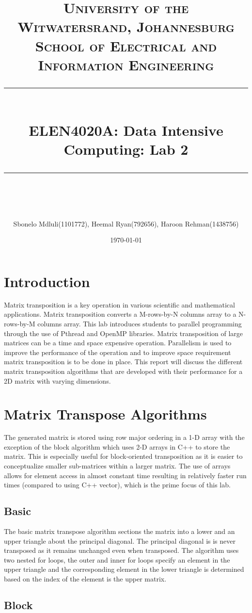 \documentclass[10pt,journal]{article}
\title{	
	\normalfont\largesize
	\textbf{\textsc{University of the Witwatersrand, Johannesburg}}\\
	\textsc{School of Electrical and Information Engineering}\\ 
	\vspace{5pt} %
	\rule{\linewidth}{0.5pt}\\ %
	\vspace{10pt} %
	{\huge ELEN4020A: Data Intensive Computing: Lab 2}\\ %
	\vspace{1pt} %
	\rule{\linewidth}{2pt}\\ %
	\vspace{1pt} %
}
\author{ Sbonelo Mdluli(1101772), Heemal Ryan(792656), Haroon Rehman(1438756) }
\date{\large\today}
\begin{document}
\maketitle 

\section{Introduction}
Matrix transposition is a key operation in various scientific and mathematical applications. Matrix transposition converts a M-rows-by-N columns array to a N-rows-by-M columns array. This lab introduces students to parallel programming through the use of Pthread and OpenMP libraries. Matrix transposition of large matrices can be a time and space expensive operation. Parallelism is used to improve the performance of the operation and to improve space requirement matrix transposition is to be done in place. This report will discuss the different matrix transposition algorithms that are developed with their performance for a 2D matrix with varying dimensions. 

\section{Matrix Transpose Algorithms}

The generated matrix is stored using row major ordering in a 1-D array with the exception of the block algorithm which uses 2-D arrays in C++ to store the matrix. This is especially useful for block-oriented transposition as it is easier to conceptualize smaller sub-matrices within a larger matrix. The use of arrays allows for element access in almost constant time resulting in relatively faster run times (compared to using C++ vector), which is the prime focus of this lab.    

\subsection{Basic}

The basic matrix transpose algorithm sections the matrix into a lower and an upper triangle about the principal diagonal. The principal diagonal is is never transposed as it remains unchanged even when transposed. The algorithm uses two nested for loops, the outer and inner for loops specify an element in the upper triangle and the corresponding element in the lower triangle is determined based on the index of the element is the upper matrix.

\subsection{Block}
\end{document}
